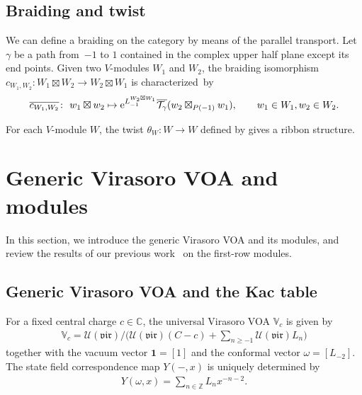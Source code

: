 \documentclass[10pt,a4paper]{amsart}
\numberwithin{equation}{section}
\newcommand{\ol}[1]{\overline{#1}}
\newcommand{\bC}{\mathbb{C}}
\newcommand{\bZ}{\mathbb{Z}}
\newcommand{\cT}{\mathcal{T}}
\newcommand{\cU}{\mathcal{U}}
\newcommand{\bbmi}{\mathbbm{i}}
\newcommand{\UEA}{\cU}
\newcommand{\voagen}{V}
\newcommand{\voamodgen}{W}
\newcommand{\voavac}{\mathbf{1}}
\newcommand{\voaY}{Y}
\newcommand{\voaconf}{\omega}
\newcommand{\vmodvec}{w}
\newcommand{\virvoa}{\mathbb{V}}
\newcommand{\vir}{\mathfrak{vir}}
\begin{document}
\subsection{Braiding and twist}
\label{sect:HL_braiding}
We can define a braiding on the category by means of the parallel transport.
Let $\gamma$ be a path from~$-1$ to $1$ contained in the complex upper half plane except its end points.
Given two $\voagen$-modules $\voamodgen_{1}$ and $\voamodgen_{2}$, the braiding isomorphism $c_{\voamodgen_{1},\voamodgen_{2}}\colon \voamodgen_{1}\boxtimes\voamodgen_{2}\to \voamodgen_{2}\boxtimes \voamodgen_{1}$ is characterized~by
\begin{gather*}
 \ol{c_{\voamodgen_{1},\voamodgen_{2}}}\colon\ \vmodvec_{1}\boxtimes\vmodvec_{2}\mapsto {\rm e}^{L^{\voamodgen_{2}\boxtimes\voamodgen_{1}}_{-1}}\ol{\cT_{\gamma}}(\vmodvec_{2}\boxtimes_{P(-1)}\vmodvec_{1}),\qquad \vmodvec_{1}\in\voamodgen_{1}, \vmodvec_{2}\in \voamodgen_{2}.
\end{gather*}

For each $\voagen$-module $\voamodgen$, the twist $\theta_{\voamodgen}\colon \voamodgen\to\voamodgen$ defined by \smash{$\theta_{\voamodgen}={\rm e}^{2\pi\bbmi L_{0}^{\voamodgen}}$} gives a ribbon structure.


\section{Generic Virasoro VOA and modules}
\label{sect:generic_VirVOA}
In this section, we introduce the generic Virasoro VOA and its modules, and review the results of our previous work~\cite{KoshidaKytola2022} on the first-row modules.

\subsection{Generic Virasoro VOA and the Kac table}
For a fixed central charge $c\in \bC$, the universal Virasoro VOA $\virvoa_{c}$ is given by
\begin{gather*}
 \virvoa_{c}=\UEA (\vir)/\big(\UEA (\vir)(C-c)+\textstyle{\sum_{n\geq -1}}\UEA (\vir)L_{n}\big)
\end{gather*}
together with the vacuum vector $\voavac=[1]$ and the conformal vector $\voaconf=[L_{-2}]$.
The state field correspondence map $\voaY(-,x)$ is uniquely determined by
\begin{gather*}
 \voaY(\voaconf,x)=\sum_{n\in\bZ}L_{n}x^{-n-2}.
\end{gather*}
\end{document}
